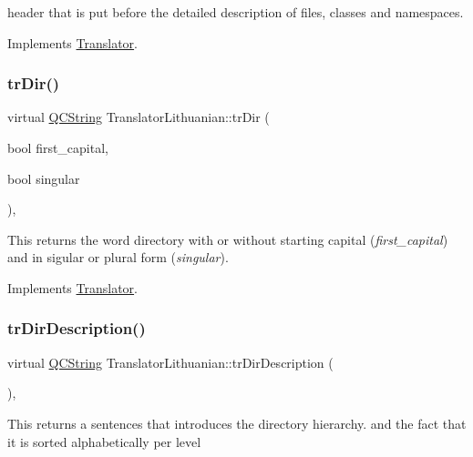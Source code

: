 header that is put before the detailed description of files, classes and namespaces. 

Implements \mbox{\hyperlink{class_translator}{Translator}}.

\mbox{\label{class_translator_lithuanian_a0d40d70a9821529c667a09e2e0962d97}} 
\subsubsection{\texorpdfstring{trDir()}{trDir()}}
{\footnotesize\ttfamily virtual \mbox{\hyperlink{class_q_c_string}{Q\+C\+String}} Translator\+Lithuanian\+::tr\+Dir (\begin{DoxyParamCaption}\item[{bool}]{first\+\_\+capital,  }\item[{bool}]{singular }\end{DoxyParamCaption})\hspace{0.3cm}{\ttfamily [inline]}, {\ttfamily [virtual]}}

This returns the word directory with or without starting capital ({\itshape first\+\_\+capital}) and in sigular or plural form ({\itshape singular}). 

Implements \mbox{\hyperlink{class_translator}{Translator}}.

\mbox{\label{class_translator_lithuanian_a9dd9e8251d8ce6d17918057829ebbc70}} 
\subsubsection{\texorpdfstring{trDirDescription()}{trDirDescription()}}
{\footnotesize\ttfamily virtual \mbox{\hyperlink{class_q_c_string}{Q\+C\+String}} Translator\+Lithuanian\+::tr\+Dir\+Description (\begin{DoxyParamCaption}{ }\end{DoxyParamCaption})\hspace{0.3cm}{\ttfamily [inline]}, {\ttfamily [virtual]}}

This returns a sentences that introduces the directory hierarchy. and the fact that it is sorted alphabetically per level 

